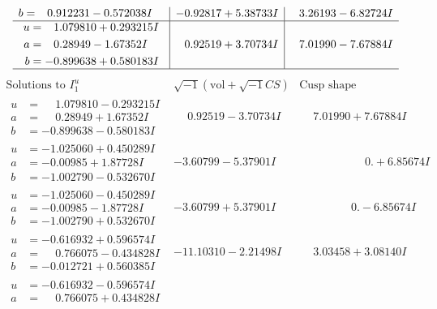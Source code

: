 \documentclass[1p]{elsarticle_modified}
\theoremstyle{definition}
\newcommand{\I}{\sqrt{-1}}
\begin{document}
$$\begin{array}{c|c|c}
\begin{aligned}
b &= \phantom{-}0.912231 - 0.572038 I\end{aligned}
 & -0.92817 + 5.38733 I & \phantom{-}3.26193 - 6.82724 I \\ \hline\begin{aligned}
u &= \phantom{-}1.079810 + 0.293215 I \\
a &= \phantom{-}0.28949 - 1.67352 I \\
b &= -0.899638 + 0.580183 I\end{aligned}
 & \phantom{-}0.92519 + 3.70734 I & \phantom{-}7.01990 - 7.67884 I\\
 \hline 
 \end{array}$$\newpage$$\begin{array}{c|c|c}  
\text{Solutions to }I^u_{1}& \I (\text{vol} + \sqrt{-1}CS) & \text{Cusp shape}\\
 \hline 
\begin{aligned}
u &= \phantom{-}1.079810 - 0.293215 I \\
a &= \phantom{-}0.28949 + 1.67352 I \\
b &= -0.899638 - 0.580183 I\end{aligned}
 & \phantom{-}0.92519 - 3.70734 I & \phantom{-}7.01990 + 7.67884 I \\ \hline\begin{aligned}
u &= -1.025060 + 0.450289 I \\
a &= -0.00985 + 1.87728 I \\
b &= -1.002790 - 0.532670 I\end{aligned}
 & -3.60799 - 5.37901 I & \phantom{-0.000000 -}0. + 6.85674 I \\ \hline\begin{aligned}
u &= -1.025060 - 0.450289 I \\
a &= -0.00985 - 1.87728 I \\
b &= -1.002790 + 0.532670 I\end{aligned}
 & -3.60799 + 5.37901 I & \phantom{-0.000000 } 0. - 6.85674 I \\ \hline\begin{aligned}
u &= -0.616932 + 0.596574 I \\
a &= \phantom{-}0.766075 - 0.434828 I \\
b &= -0.012721 + 0.560385 I\end{aligned}
 & -11.10310 - 2.21498 I & \phantom{-}3.03458 + 3.08140 I \\ \hline\begin{aligned}
u &= -0.616932 - 0.596574 I \\
a &= \phantom{-}0.766075 + 0.434828 I \\

\end{aligned}
\end{array}$$
\end{document}
